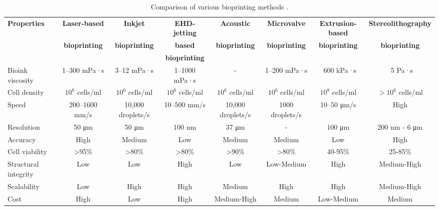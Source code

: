 \begin{table}[ht]
	\caption[Comparison of various bioprinting methods.]{Comparison of various bioprinting methods \cite{Vijayavenkataraman2018_bioprinting_tissues_organs_regen_med}.}
	\label{tab:system_architecture_requirements_bioprinting_methods_comparison}
\centering
\begin{adjustbox}{width=1.2\textwidth,center=\textwidth}
\begin{tabular}{lccccccc}
	\toprule
	\textbf{Properties} & \textbf{Laser-based} & \textbf{Inkjet} & \textbf{EHD-jetting} & \textbf{Acoustic} & \textbf{Microvalve} & \textbf{Extrusion-based} & \textbf{Stereolithography}\\
    & \textbf{bioprinting} & \textbf{bioprinting} & \textbf{based} & \textbf{bioprinting} & \textbf{bioprinting} & \textbf{bioprinting} & \textbf{bioprinting}\\
    & & & \textbf{bioprinting} & & & &\\
	\midrule

Bioink viscosity & 1–300 mPa·s & 3–12 mPa·s & 1–1000 mPa·s & - & 1–200 mPa·s & ~600 kPa·s & ~5 Pa·s \\

Cell density & $10^8$ cells/ml & $10^6$ cells/ml & $10^6$ cells/ml & $10^6$ cells/ml & $10^6$ cells/ml & $10^8$ cells/ml & $>10^6$ cells/ml\\

Speed & 200–1600 mm/s & 10,000 droplets/s & 10–500 mm/s & 10,000 droplets/s & 1000 droplets/s & 10–50 \si{\micro\meter}/s & High\\

Resolution & 50 \si{\micro\meter} & 50 \si{\micro\meter} & 100 nm & 37 \si{\micro\meter} & - & 100 \si{\micro\meter} & 200 nm - 6 \si{\micro\meter}\\

Accuracy & High & Medium & Low & Medium & Medium & Low & High\\

Cell viability & >95\% & >80\% & >80\% & >90\% & >80\% & 40-95\% & 25-85\%\\

Structural integrity & Low & Low & High & Low & Low-Medium & High & Medium-High\\

Scalability & Low & High & High & Medium & High & High & Medium-High\\

Cost & High & Low & High & Medium-High & Medium & Low-Medium & Medium \\
    \bottomrule
\end{tabular}
\end{adjustbox} 
\end{table}


